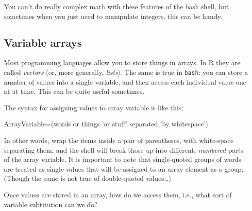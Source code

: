 \documentclass[]{krantz}
\makeatletter
\newenvironment{Shaded}{\begin{snugshade}}{\end{snugshade}}
\newcommand{\BuiltInTok}[1]{#1}
\newcommand{\CommentTok}[1]{\textcolor[rgb]{0.37,0.37,0.37}{\textit{#1}}}
\newcommand{\ExtensionTok}[1]{#1}
\newcommand{\NormalTok}[1]{#1}
\newcommand{\StringTok}[1]{\textcolor[rgb]{0.5,0.5,0.5}{#1}}
\newcommand{\VariableTok}[1]{\textcolor[rgb]{0,0,0}{#1}}
\newenvironment{kframe}{%
\medskip{}
\setlength{\fboxsep}{.8em}
 \def\at@end@of@kframe{}%
 \ifinner\ifhmode%
  \def\at@end@of@kframe{\end{minipage}}%
  \begin{minipage}{\columnwidth}%
 \fi\fi%
 \def\FrameCommand##1{\hskip\@totalleftmargin \hskip-\fboxsep
 \colorbox{shadecolor}{##1}\hskip-\fboxsep
     \hskip-\linewidth \hskip-\@totalleftmargin \hskip\columnwidth}%
 \MakeFramed {\advance\hsize-\width
   \@totalleftmargin\z@ \linewidth\hsize
   \@setminipage}}%
 {\par\unskip\endMakeFramed%
 \at@end@of@kframe}
\renewenvironment{Shaded}{\begin{kframe}}{\end{kframe}}
\makeatother
\begin{document}
\begin{itemize}
\begin{Shaded}
\end{Shaded}
\end{itemize}

You can't do really complex math with these features of the bash shell, but sometimes
when you just need to manipulate integers, this can be handy.

\hypertarget{variable-arrays}{%
\subsection{Variable arrays}\label{variable-arrays}}

Most programming languages allow you to store things in arrays. In R they
are called \emph{vectors} (or, more generally, \emph{lists}). The same is true in
\texttt{bash}: you can store a number of values into a single variable, and then
access each individual value one at at time. This can be quite useful sometimes.

The syntax for assigning values to array variable is like this:

\begin{Shaded}
\begin{Highlighting}[]
\VariableTok{ArrayVariable=(}\NormalTok{words or things }\StringTok{'or stuff'}\NormalTok{ separated }\StringTok{'by whitespace'}\VariableTok{)}
\end{Highlighting}
\end{Shaded}

In other words, wrap the items inside a pair of parentheses, with white-space
separating them, and the shell will break those up into different, \emph{numbered}
parts of the array variable. It is important to note that single-quoted groups of words
are treated as single values that will be assigned to an array element as a group.
(Though the same is not true of double-quoted values\ldots{})

Once values are stored in an array, how do we access them, i.e., what sort
of variable subtitution can we do?
\end{document}
